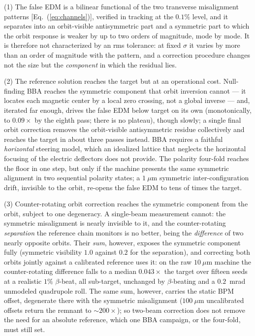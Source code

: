 \documentclass[aps,prab,reprint,superscriptaddress,nofootinbib]{revtex4-2}
\begin{document}
(1) The false EDM is a bilinear functional of the two transverse misalignment
patterns [Eq.~(\ref{eq:channels})], verified in tracking at the $0.1\%$ level,
and it separates into an orbit-visible antisymmetric part and a symmetric part
to which the orbit response is weaker by up to two orders of magnitude, mode by
mode.  It is therefore not characterized by an rms tolerance: at fixed $\sigma$
it varies by more than an order of magnitude with the pattern, and a correction
procedure changes not the size but the \emph{component} in which the residual
lies.

(2) The reference solution reaches the target but at an operational cost.
Null-finding BBA reaches the symmetric component that orbit inversion cannot ---
it locates each magnetic center by a local zero crossing, not a global inverse
--- and, iterated far enough, drives the false EDM below target on its own
(monotonically, to $0.09\times$ by the eighth pass; there is no plateau), though
slowly; a single final orbit correction removes the orbit-visible antisymmetric
residue collectively and reaches the target in about three passes instead.  BBA
requires a faithful \emph{horizontal} steering model, which an idealized lattice
that neglects the horizontal focusing of the electric deflectors does not
provide.  The polarity four-fold reaches the floor in one step, but only if the
machine presents the same symmetric alignment in two sequential polarity states;
a $1~\mu$m symmetric inter-configuration drift, invisible to the orbit, re-opens
the false EDM to tens of times the target.

(3) Counter-rotating orbit correction reaches the symmetric component from the
orbit, subject to one degeneracy.  A single-beam measurement cannot: the
symmetric misalignment is nearly invisible to it, and the counter-rotating
\emph{separation} the reference chain monitors is no better, being the
\emph{difference} of two nearly opposite orbits.  Their \emph{sum}, however,
exposes the symmetric component fully (symmetric visibility $1.0$ against $0.2$
for the separation), and correcting both orbits jointly against a calibrated
reference uses it: on the raw $10~\mu$m machine the counter-rotating difference
falls to a median $0.043\times$ the target over fifteen seeds at a realistic
$1\%$ $\beta$-beat, all sub-target, unchanged by $\beta$-beating and a
$0.2$~mrad unmodeled quadrupole roll.  The same sum, however, carries the static BPM
offset, degenerate there with the symmetric misalignment ($100~\mu$m
uncalibrated offsets return the remnant to $\sim\!200\times$); so two-beam
correction does not remove the need for an absolute reference, which one BBA
campaign, or the four-fold, must still set.
\end{document}
